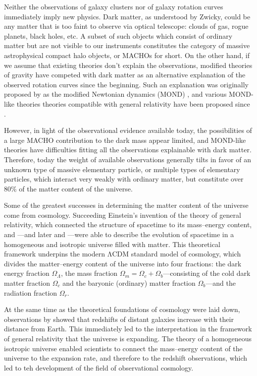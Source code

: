 \documentclass[b5paper, 10pt, twoside]{book}
\begin{document}
Neither the observations of galaxy clusters nor of galaxy rotation curves immediately imply new physics. Dark matter, as understood by Zwicky, could be any matter that is too faint to observe via optical telescope: clouds of gas, rogue planets, black holes, etc. A subset of such objects which consist of ordinary matter but are not visible to our instruments constitutes the category of massive astrophysical compact halo objects, or MACHOs for short. On the other hand, if we assume that existing theories don't explain the observations, modified theories of gravity have competed with dark matter as an alternative explanation of the observed rotation curves since the beginning. Such an explanation was originally proposed by \textcite{Milgrom1983} as the modified Newtonian dynamics (MOND) \parencite{Milgrom1983}, and various MOND-like theories theories compatible with general relativity have been proposed since \parencites{Bekenstein2004, Milgrom2009, SkordisZlosnik2021}.

However, in light of the observational evidence available today, the possibilities of a large MACHO contribution to the dark mass appear limited, and MOND-like theories have difficulties fitting all the observations explainable with dark matter. Therefore, today the weight of available observations generally tilts in favor of an unknown type of massive elementary particle, or multiple types of elementary particles, which interact very weakly with ordinary matter, but constitute over 80\% of the matter content of the universe.

Some of the greatest successes in determining the matter content of the universe come from cosmology. Succeeding Einstein's invention of the theory of general relativity, which connected the structure of spacetime to its mass--energy content, \textcites{Friedmann1922, Friedmann1924} and \textcite{Lemaitre1927}---and later \textcites{Robertson1935, Robertson1936a, Robertson1936b} and \textcite{Walker1937}---were able to describe the evolution of spacetime in a homogeneous and isotropic universe filled with matter. This theoretical framework underpins the modern ΛCDM standard model of cosmology, which divides the matter--energy content of the universe into four fractions: the dark energy fraction $\Omega_\Lambda$, the mass fraction $\Omega_m=\Omega_c+\Omega_b$---consisting of the cold dark matter fraction $\Omega_c$ and the baryonic (ordinary) matter fraction $\Omega_b$---and the radiation fraction $\Omega_r$.

At the same time as the theoretical foundations of cosmology were laid down, observations by \textcites{Slipher1917, Wirtz1922, Wirtz1924, Hubble1929} showed that redshifts of distant galaxies increase with their distance from Earth. This immediately led to the interpretation in the framework of general relativity that the universe is expanding. The theory of a homogeneous isotropic universe enabled scientists to connect the mass--energy content of the universe to the expansion rate, and therefore to the redshift observations, which led to teh development of the field of observational cosmology.
\end{document}
